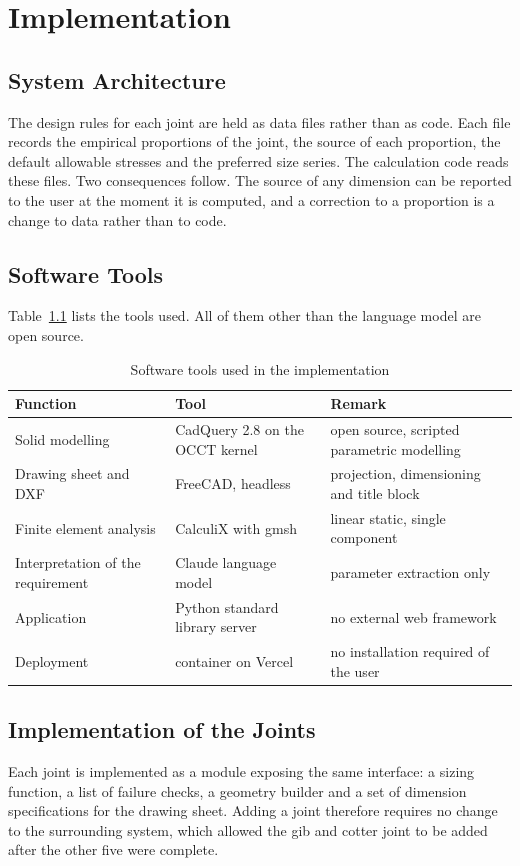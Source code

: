 \chapter{Implementation}

\section{System Architecture}
The design rules for each joint are held as data files rather than as code. Each file records the empirical proportions of the joint, the source of each proportion, the default allowable stresses and the preferred size series. The calculation code reads these files. Two consequences follow. The source of any dimension can be reported to the user at the moment it is computed, and a correction to a proportion is a change to data rather than to code.

\section{Software Tools}
Table~\ref{tab:tools-sw} lists the tools used. All of them other than the language model are open source.

\begin{table}[h]
\centering
\caption{Software tools used in the implementation}
\label{tab:tools-sw}
\begin{tabularx}{\textwidth}{llX}
\toprule
Function & Tool & Remark \\
\midrule
Solid modelling & CadQuery 2.8 on the OCCT kernel & open source, scripted parametric modelling \\
Drawing sheet and DXF & FreeCAD, headless & projection, dimensioning and title block \\
Finite element analysis & CalculiX with gmsh & linear static, single component \\
Interpretation of the requirement & Claude language model & parameter extraction only \\
Application & Python standard library server & no external web framework \\
Deployment & container on Vercel & no installation required of the user \\
\bottomrule
\end{tabularx}
\end{table}

\section{Implementation of the Joints}
Each joint is implemented as a module exposing the same interface: a sizing function, a list of failure checks, a geometry builder and a set of dimension specifications for the drawing sheet. Adding a joint therefore requires no change to the surrounding system, which allowed the gib and cotter joint to be added after the other five were complete.

